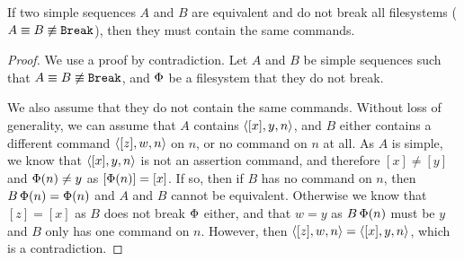 \begin{mylem}\label{equiv_simple_same_commands}
If two simple sequences $A$ and $B$ are equivalent
and do not break all filesystems ($A\equiv B\not\equiv\mathtt{Break}$),
then they must contain the same commands.
\end{mylem}
\begin{proof}
We use a proof by contradiction. Let $A$ and $B$ be simple sequences
such that $A\equiv B\not\equiv\mathtt{Break}$,
and $\Phi$ be a filesystem that they do not break.

We also assume that they do not contain the same commands.
Without loss of generality, we can assume
that $A$
contains $\langle{[x],y,n}\rangle$, and $B$ either contains a different command
$\langle{[z],w,n}\rangle$ on $n$, or no command on $n$ at all.
As $A$ is simple, we know that $\langle{[x],y,n}\rangle$ is not an assertion command,
and therefore $[x]\neq [y]$ and $\Phi(n)\neq y$ as $[\Phi(n)]=[x]$.
If so, then if $B$ has no command on $n$, then $B\,\Phi(n)=\Phi(n)$ and
$A$ and $B$ cannot be equivalent.
Otherwise we know that $[z]=[x]$ as $B$ does not break $\Phi$ either,
and that $w=y$ as $B\,\Phi(n)$ must
be $y$ and $B$ only has one command on $n$.
However, then $\langle{[z],w,n}\rangle=\langle{[x],y,n}\rangle$, which is a contradiction.
\end{proof}



